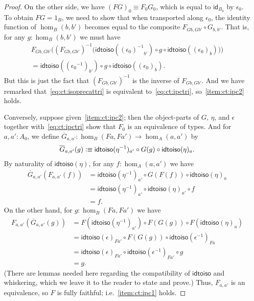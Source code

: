 \documentclass[10pt,a4paper]{article}
\newcommand{\jdeq}{\equiv}      %
\newcommand{\defeq}{\vcentcolon\equiv}  %
\newcommand{\opp}[1]{\mathord{{#1}^{-1}}}
\newcommand{\idfunc}[1][]{\ensuremath{\mathsf{id}_{#1}}\xspace}
\newcommand{\inv}[1]{{#1}^{-1}}
\newcommand{\idtoiso}{\ensuremath{\mathsf{idtoiso}}\xspace}
\theoremstyle{definition}
\theoremstyle{remark}
\numberwithin{equation}{section}
\begin{document}
\begin{proof}
  On the other side, we have $(FG)_0\jdeq F_0 G_0$, which is equal to $\idfunc[B_0]$ by $\epsilon_0$.
  To obtain $FG=1_B$, we need to show that when transported along $\epsilon_0$, the identity function of $\hom_B(b,b')$ becomes equal to the composite $F_{Gb,Gb'} \circ G_{b,b'}$.
  That is, for any $g:\hom_B(b,b')$ we must have
  \begin{multline*}
    F_{Gb,Gb'}\Big(\inv{(F_{Gb,Gb'})}\Big(\idtoiso(\opp{(\epsilon_0)}_{b'}) \circ g \circ \idtoiso((\epsilon_0)_b)\Big)\Big)\\
    = \idtoiso((\opp{\epsilon_0})_{b'}) \circ g \circ \idtoiso((\epsilon_0)_b).
  \end{multline*}
  But this is just the fact that $\inv{(F_{Gb,Gb'})}$ is the inverse of $F_{Gb,Gb'}$.
  And we have remarked that~\eqref{eq:ct:isoprecattri} is equivalent to~\eqref{eq:ct:ipctri}, so~\ref{item:ct:ipc2} holds.

  Conversely, suppose given~\ref{item:ct:ipc2}; then the object-parts of $G$, $\eta$, and $\epsilon$ together with~\eqref{eq:ct:ipctri} show that $F_0$ is an equivalence of types.
  And for $a,a':A_0$, we define $\overline{G}_{a,a'}: \hom_B(Fa,Fa') \to \hom_A(a,a')$ by
  \begin{equation}
    \overline{G}_{a,a'}(g) \defeq \idtoiso(\opp{\eta})_{a'} \circ G(g) \circ \idtoiso(\eta)_a.\label{eq:ct:gbar}
  \end{equation}
  By naturality of $\idtoiso(\eta)$, for any $f:\hom_A(a,a')$ we have
  \begin{align*}
    \overline{G}_{a,a'}(F_{a,a'}(f))
    &= \idtoiso(\opp{\eta})_{a'} \circ G(F(f)) \circ \idtoiso(\eta)_a\\
    &= \idtoiso(\opp{\eta})_{a'} \circ \idtoiso(\eta)_{a'} \circ f \\
    &= f.
  \end{align*}
  On the other hand, for $g:\hom_B(Fa,Fa')$ we have
  \begin{align*}
    F_{a,a'}(\overline{G}_{a,a'}(g))
    &= F(\idtoiso(\opp{\eta})_{a'}) \circ F(G(g)) \circ F(\idtoiso(\eta)_a)\\
    &= \idtoiso(\epsilon)_{Fa'}
    \circ F(G(g))
    \circ \idtoiso(\opp{\epsilon})_{Fa}\\
    &= \idtoiso(\epsilon)_{Fa'}
    \circ \idtoiso(\opp{\epsilon})_{Fa'}
    \circ g\\
    &= g.
  \end{align*}
  (There are lemmas needed here regarding the compatibility of \idtoiso and whiskering, which we leave it to the reader to state and prove.)
  Thus, $F_{a,a'}$ is an equivalence, so $F$ is fully faithful; i.e.~\ref{item:ct:ipc1} holds.


\end{proof}
\end{document}
